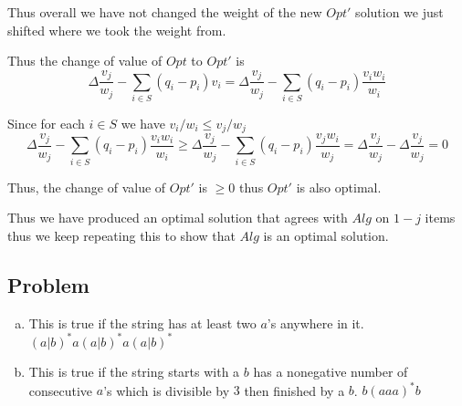 \documentclass[12pt, letterpaper]{article}
\theoremstyle{definition}
\newcounter{problem}
\newcommand{\q}{
    \newpage %
    \stepcounter{problem} %
    \subsection*{Problem \arabic{problem}} %
}
\begin{document}
\begin{enumerate}[(a)]
    Thus overall we have not changed the weight of the new $Opt'$ solution we just shifted where we took the weight from.

    Thus the change of value of $Opt$ to $Opt'$ is
    \[\Delta \dfrac{v_j}{w_j}-\sum_{i \in S}(q_i-p_i)v_i=\Delta \dfrac{v_j}{w_j}-\sum_{i \in S}(q_i-p_i)\dfrac{v_i w_i}{w_i}\]
    
    Since for each $i \in S$ we have $v_i/w_i \leq v_j/w_j$
    \[\Delta \dfrac{v_j}{w_j}-\sum_{i \in S}(q_i-p_i)\dfrac{v_i w_i}{w_i} \geq \Delta \dfrac{v_j}{w_j}-\sum_{i \in S}(q_i-p_i)\dfrac{v_j w_i}{w_j}=\Delta \dfrac{v_j}{w_j}-\Delta\dfrac{v_j}{w_j}=0\]

    Thus, the change of value of $Opt'$ is $\geq 0$ thus $Opt'$ is also optimal.

    Thus we have produced an optimal solution that agrees with $Alg$ on $1-j$ items thus we keep repeating this to show that $Alg$ is an optimal solution.
\end{enumerate}

\q
\begin{enumerate}[(a)]
    \item This is true if the string has at least two $a$'s anywhere in it. $(a|b)^*a(a|b)^*a(a|b)^*$
    
    \item This is true if the string starts with a $b$ has a nonegative number of consecutive $a$'s which is divisible by $3$ then finished by a $b$. $b(aaa)^*b$
\end{enumerate}
\end{document}
